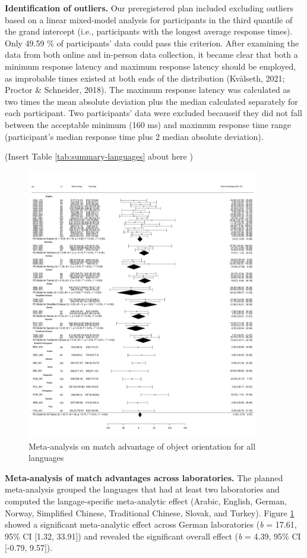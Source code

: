 \documentclass[
  man]{apa7}
\begin{document}
\textbf{Identification of outliers.} Our preregistered plan included excluding outliers based on a linear mixed-model analysis for participants in the third quantile of the grand intercept (i.e., participants with the longest average response times). Only 49.59 \% of participants' data could pass this criterion. After examining the data from both online and in-person data collection, it became clear that both a minimum response latency and maximum response latency should be employed, as improbable times existed at both ends of the distribution (Kvålseth, 2021; Proctor \& Schneider, 2018). The maximum response latency was calculated as two times the mean absolute deviation plus the median calculated separately for each participant. Two participants' data were excluded becauseif they did not fall between the acceptable minimum (160 ms) and maximum response time range (participant's median response time plus 2 median absolute deviation).

(Insert Table \ref{tab:summary-languages} about here )

\begin{figure}
\includegraphics[width=4in]{includes/fig/meta-all} \caption{Meta-analysis on match advantage of object orientation for all languages}\label{fig:meta-all-plot}
\end{figure}

\textbf{Meta-analysis of match advantages across laboratories.} The planned meta-analysis grouped the languages that had at least two laboratories and computed the langage-specific meta-analytic effect (Arabic, English, German, Norway, Simplified Chinese, Traditional Chinese, Slovak, and Turkey). Figure \ref{fig:meta-all-plot} showed a significant meta-analytic effect across German laboratories (\emph{b} = 17.61, 95\% CI {[}1.32, 33.91{]}) and revealed the significant overall effect (\emph{b} = 4.39, 95\% CI {[}-0.79, 9.57{]}).
\end{document}
